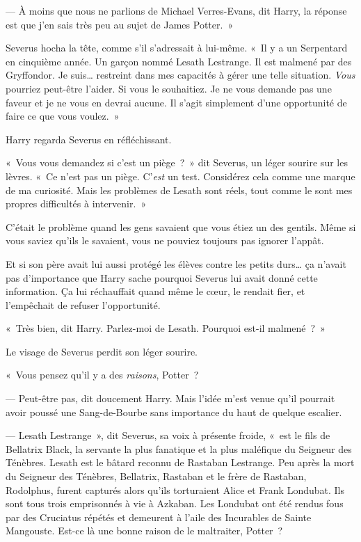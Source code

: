 --- À moins que nous ne parlions de Michael Verres-Evans, dit Harry, la réponse est que j'en sais très peu au sujet de James Potter.~»

Severus hocha la tête, comme s'il s'adressait à lui-même.
«~Il y a un Serpentard en cinquième année.
Un garçon nommé Lesath Lestrange.
Il est malmené par des Gryffondor.
Je suis… restreint dans mes capacités à gérer une telle situation.
\emph{Vous} pourriez peut-être l'aider.
Si vous le souhaitiez.
Je ne vous demande pas une faveur et je ne vous en devrai aucune.
Il s'agit simplement d'une opportunité de faire ce que vous voulez.~»

Harry regarda Severus en réfléchissant.

«~Vous vous demandez si c'est un piège~?~»
dit Severus, un léger sourire sur les lèvres.
«~Ce n'est pas un piège.
C'\emph{est} un test.
Considérez cela comme une marque de ma curiosité.
Mais les problèmes de Lesath sont réels, tout comme le sont mes propres difficultés à intervenir.~»

C'était le problème quand les gens savaient que vous étiez un des gentils.
Même si vous saviez qu'ils le savaient, vous ne pouviez toujours pas ignorer l'appât.

Et si son père avait lui aussi protégé les élèves contre les petits durs… ça n'avait pas d'importance que Harry sache pourquoi Severus lui avait donné cette information.
Ça lui réchauffait quand même le cœur, le rendait fier, et l'empêchait de refuser l'opportunité.

«~Très bien, dit Harry.
Parlez-moi de Lesath.
Pourquoi est-il malmené~?~»

Le visage de Severus perdit son léger sourire.

«~Vous pensez qu'il y a des \emph{raisons}, Potter~?

--- Peut-être pas, dit doucement Harry.
Mais l'idée m'est venue qu'il pourrait avoir poussé une Sang-de-Bourbe sans importance du haut de quelque escalier.

--- Lesath Lestrange~», dit Severus, sa voix à présente froide, «~est le fils de Bellatrix Black, la servante la plus fanatique et la plus maléfique du Seigneur des Ténèbres.
Lesath est le bâtard reconnu de Rastaban Lestrange.
Peu après la mort du Seigneur des Ténèbres, Bellatrix, Rastaban et le frère de Rastaban, Rodolphus, furent capturés alors qu'ils torturaient Alice et Frank Londubat.
Ils sont tous trois emprisonnés à vie à Azkaban.
Les Londubat ont été rendus fous par des Cruciatus répétés et demeurent à l'aile des Incurables de Sainte Mangouste.
Est-ce là une bonne raison de le maltraiter, Potter~?


